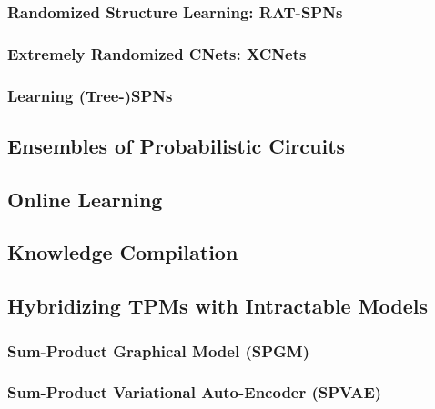 			\subsubsection{Randomized Structure Learning: RAT-SPNs} %

			\subsubsection{Extremely Randomized CNets: XCNets} %

			\subsubsection{Learning (Tree-)SPNs} %

		\subsection{Ensembles of Probabilistic Circuits} %

		\subsection{Online Learning} %

		\subsection{Knowledge Compilation} %

		\subsection{Hybridizing TPMs with Intractable Models} %

			\subsubsection{Sum-Product Graphical Model (SPGM)} %

			\subsubsection{Sum-Product Variational Auto-Encoder (SPVAE)} %

